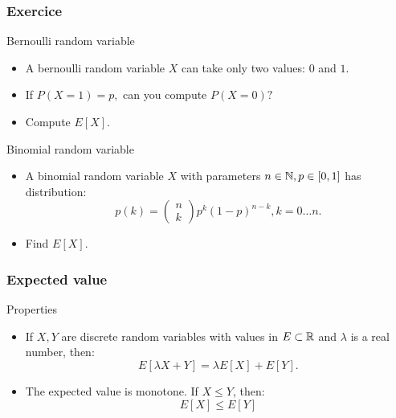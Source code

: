 \begin{frame}
    \frametitle{Exercice}
\begin{block}{Bernoulli random variable}
    \begin{itemize}
        \item<+-> A bernoulli random variable $X$ can take only two values: $0$ and $1$.
        \item<+-> If $P\left( X=1 \right)  = p, $ can you compute $P\left( X=0 \right) ?$
        \item<+-> Compute $E\left[ X \right].$
    \end{itemize}
\end{block}
\begin{block}{Binomial random variable}
    \begin{itemize}
        \item<+-> A binomial random variable $X$ with parameters $n \in \mathbb{N}, p \in [0,1]$ has 
        distribution:
        \begin{equation}
            p(k) = \begin{pmatrix}
                n \\ k
            \end{pmatrix} p^k \left( 1-p \right)^{n-k}, k = 0 \dots n.
        \end{equation}
        \item<+-> Find $E\left[ X \right].$
    \end{itemize}
\end{block}

\end{frame}
\begin{frame}
    \frametitle{Expected value}
\begin{block}{Properties}
    \begin{itemize}
        \item<+-> If $X,Y$ are discrete random variables with values in $E \subset \mathbb{R}$ and 
        $\lambda$ is a real number, then:
        \begin{equation}
            E\left[ \lambda X + Y \right] = \lambda E\left[ X \right] + E \left[ Y \right].
        \end{equation}
        \item<+-> The expected value is monotone. If $X \leq Y$, then:
        \begin{equation}
            E\left[ X \right] \leq E \left[ Y \right]
        \end{equation}
       
    \end{itemize}
\end{block}
\end{frame}
